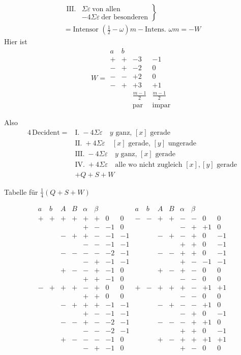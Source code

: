 \[
\begin{gathered}
\left.\begin{array}{rl}
\mathrm{III.}&\Sigma\varepsilon\ \text{von allen}\\
&-4\Sigma\varepsilon\ \text{der besonderen}
\end{array}\right\}\\
={}\text{Intensor }(\tfrac12-\omega)m-\text{Intens. }\omega m=-W
\end{gathered}
\]
Hier ist
\[
W=\begin{array}{cc|rr}
a&b&&\\
+&+&-3&-1\\
-&+&-2&0\\
-&-&+2&0\\
-&+&+3&+1\\[3pt]
&&\frac{m-1}{2}&\frac{m-1}{2}\\
&&\text{par}&\text{impar}
\end{array}
\]

Also
\[
\begin{aligned}
4\,\text{Decident}={}&\text{I.}\;-4\Sigma\varepsilon\quad y\text{ ganz, }[x]\text{ gerade}\\
&\text{II.}\;+4\Sigma\varepsilon\quad[x]\text{ gerade, }[y]\text{ ungerade}\\
&\text{III.}\;-4\Sigma\varepsilon\quad y\text{ ganz, }[x]\text{ gerade}\\
&\text{IV.}\;+4\Sigma\varepsilon\quad\text{alle wo nicht zugleich }[x],[y]\text{ gerade}\\
&+Q+S+W
\end{aligned}
\]

\begin{center}Tabelle für $\frac14(Q+S+W)$\end{center}
\begingroup\small\setlength{\arraycolsep}{2pt}
\[
\begin{array}{cccccc|rr||cccccc|rr}
a&b&A&B&\alpha&\beta&&&a&b&A&B&\alpha&\beta&&\\
+&+&+&+&+&+&0&0&-&-&+&+&-&-&0&0\\
&&&&+&-&-1&0&&&&&-&+&+1&0\\
&&-&+&+&-&-1&-1&&&-&+&-&+&0&-1\\
&&&&-&-&-1&-1&&&&&+&+&0&-1\\
&&-&-&-&-&-2&-1&&&-&-&+&+&0&-1\\
&&&&-&+&-1&-1&&&&&+&-&-1&-1\\
&&+&-&-&+&-1&0&&&+&-&+&-&0&0\\
&&&&+&+&-1&0&&&&&-&-&0&0\\[3pt]
-&+&+&+&-&+&0&0&+&-&+&+&+&-&+1&+1\\
&&&&+&+&0&0&&&&&-&-&0&0\\
&&-&+&+&+&-1&-1&&&-&+&-&-&+1&0\\
&&&&+&-&-1&-1&&&&&-&+&0&-1\\
&&-&-&+&-&-2&-1&&&-&-&-&+&+1&0\\
&&&&-&-&-2&-1&&&&&+&+&0&-1\\
&&+&-&-&-&-1&0&&&+&-&+&+&+1&+1\\
&&&&-&+&-1&0&&&&&+&-&0&0\\
\end{array}
\]
\endgroup

